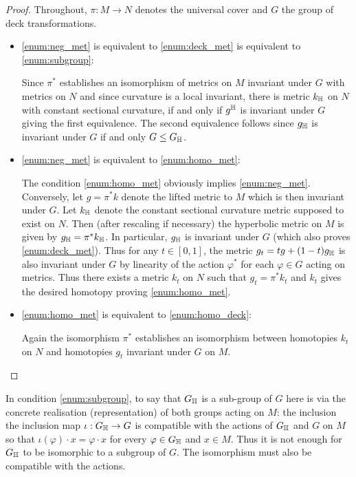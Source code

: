 \documentclass[a4paper, 12pt]{amsart}
\begin{document}
\begin{proof}
Throughout, \(\pi : M \to N\) denotes the universal cover and \(G\) the group of deck transformations.

\begin{itemize}
\item \ref{enum:neg_met} is equivalent to \ref{enum:deck_met} is equivalent to \ref{enum:subgroup}:

Since \(\pi^{\ast}\) establishes an isomorphism of metrics on \(M\) invariant under \(G\) with metrics on \(N\) and since curvature is a local invariant, there is metric \(k_{\mathbb{H}}\) on \(N\) with constant sectional curvature, if and only if \(g^{\mathbb{H}}\) is invariant under \(G\) giving the first equivalence. The second equivalence follows since \(g_{\mathbb{H}}\) is invariant under \(G\) if and only \(G \leq G_{\mathbb{H}}\).

\item \ref{enum:neg_met} is equivalent to \ref{enum:homo_met}:

The condition \ref{enum:homo_met} obviously implies \ref{enum:neg_met}. Conversely, let \(g = \pi^{\ast} k\) denote the lifted metric to \(M\) which is then invariant under \(G\). Let \(k_{\mathbb{H}}\) denote the constant sectional curvature metric supposed to exist on \(N\). Then (after rescaling if necessary) the hyperbolic metric on \(M\) is given by \(g_{\mathbb{H}} = \pi^{\ast} k_{\mathbb{H}}\). In particular, \(g_{\mathbb{H}}\)  is invariant under \(G\) (which also proves \ref{enum:deck_met}). Thus for any \(t \in [0, 1]\), the metric \(g_t = t g + (1-t) g_{\mathbb{H}}\) is also invariant under \(G\) by linearity of the action \(\varphi^{\ast}\) for each \(\varphi \in G\) acting on metrics. Thus there exists a metric \(k_t\) on \(N\) such that \(g_t = \pi^{\ast} k_t\) and \(k_t\) gives the desired homotopy proving \ref{enum:homo_met}.

\item \ref{enum:homo_met} is equivalent to \ref{enum:homo_deck}:

Again the isomorphism \(\pi^{\ast}\) establishes an isomorphism between homotopies \(k_t\) on \(N\) and homotopies \(g_t\) invariant under \(G\) on \(M\).
\end{itemize}
\end{proof}

\begin{rem}
In condition \ref{enum:subgroup}, to say that \(G_{\mathbb{H}}\) is a sub-group of \(G\) here is via the concrete realisation (representation) of both groups acting on \(M\): the inclusion the inclusion map \(\iota : G_{\mathbb{H}} \to G\) is compatible with the actions of \(G_{\mathbb{H}}\) and \(G\) on \(M\) so that \(\iota(\varphi) \cdot x = \varphi \cdot x\) for every \(\varphi \in G_{\mathbb{H}}\) and \(x \in M\). Thus it is not enough for \(G_{\mathbb{H}}\) to be isomorphic to a subgroup of \(G\). The isomorphism must also be compatible with the actions.
\end{rem}
\end{document}
